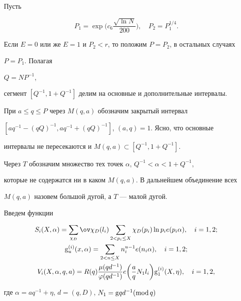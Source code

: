 Пусть 


$$


P_1=\exp\bigg(c_6\frac{\sqrt{\ln N}}{200}\bigg),\quad


P_2=P_1^{1/4}.


$$





Если $E=0$ или же $E=1$ и $P_2<r$, то положим $P=P_2$, в остальных случаях


$P=P_1$. Полагая


$Q=NP^{-1}$,


сегмент $[Q^{-1}, 1+Q^{-1}]$ делим на основные и дополнительные интервалы.


При $a\le q\le P$ через $M(q, a)$ обозначим закрытый интервал


$[aq^{-1}-(qQ)^{-1}, aq^{-1}+(qQ)^{-1}]$, $(a,q)=1$. Ясно, что основные


интервалы не пересекаются и $M(q, a)\subset [Q^{-1}, 1+Q^{-1}]$.





Через $T$ обозначим множество тех точек $\alpha$, $Q^{-1}<\alpha<1+Q^{-1}$,


которые не содержатся ни в каком $M(q, a)$. В дальнейшем объединение всех 


$M(q, a)$ назовем большой дугой, а $T$ --- малой дугой.





Введем функции


\begin{gather}


S_i(X,\alpha)=\sum_{\chi_{D}}\ov\chi_{D}(l_i)\sum_{2<p_i\le X}


\chi_D(p_i)\ln p_i e(p_i\alpha),\quad i=1, 2;\\


%


\mathrm g_u^{(i)}(x,\alpha)=\sum_{2<n\le X}n_i^{u-1}e(n_i\alpha),


\quad i=1, 2;\\


%


V_i(X,\alpha,q,a)=R(q)\frac{\mu(qd^{-1})}{\varphi(qd^{-1})}e


\bigg(\frac aq N_1l_i\bigg)\mathrm g_1^{(i)}


(X,\eta),\quad i=1, 2,


\end{gather} 


где $\alpha=aq^{-1}+\eta$, $d=(q, D)$, $N_1=\mathrm g qd^{-1}(\operatorname{mod} q)$


